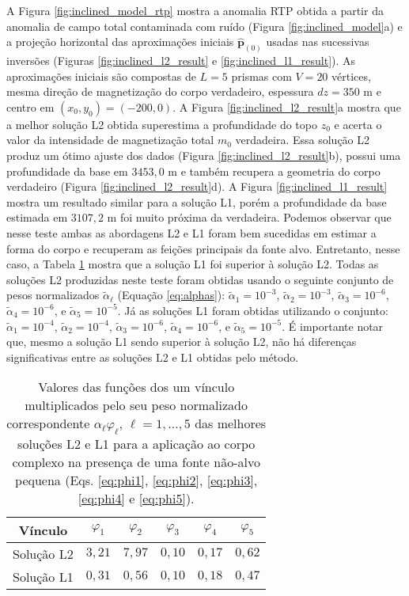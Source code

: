 A Figura \ref{fig:inclined_model_rtp} mostra a anomalia RTP obtida a partir da anomalia de campo total contaminada com ruído (Figura \ref{fig:inclined_model}a) e 
a projeção horizontal das aproximações iniciais $\hat{\mathbf{p}}_{(0)}$ 
usadas nas sucessivas inversões (Figuras \ref{fig:inclined_l2_result} e 
\ref{fig:inclined_l1_result}).
As aproximações iniciais são compostas de $ L= 5$ prismas com $ V = 20 $ vértices, mesma direção de magnetização do corpo verdadeiro, espessura $ dz=350 $ m e centro em $ (x_0, y_0) = (-200, 0) $.
A Figura \ref{fig:inclined_l2_result}a mostra que a melhor solução L2 obtida superestima a profundidade do topo $z_{0}$ e acerta o valor da intensidade de magnetização total $m_{0}$ verdadeira. Essa solução L2 produz um ótimo ajuste dos dados (Figura \ref{fig:inclined_l2_result}b), possui uma profundidade da base em $3453,0$ m e também recupera a geometria do corpo verdadeiro (Figura \ref{fig:inclined_l2_result}d).
A Figura \ref{fig:inclined_l1_result} mostra um resultado similar para a solução L1, porém a profundidade da base estimada em $3107,2$ m foi muito próxima da verdadeira.
Podemos observar que nesse teste ambas as abordagens L2 e L1 foram bem sucedidas em estimar a forma do corpo e recuperam as feições principais da fonte alvo. Entretanto, nesse caso, a Tabela \ref{tab:inc} mostra que a solução L1 foi superior à solução L2.
Todas as soluções L2 produzidas neste teste foram obtidas usando o seguinte conjunto de pesos normalizados $\tilde{\alpha}_{\ell}$ (Equação \ref{eq:alphas}): 
$\tilde{\alpha}_{1} = 10^{-3}$, $\tilde{\alpha}_{2} = 10^{-3}$, 
$\tilde{\alpha}_{3} = 10^{-6}$, $\tilde{\alpha}_{4} = 10^{-6}$, e 
$\tilde{\alpha}_{5} = 10^{-5}$. 
Já as soluções L1 foram obtidas utilizando o conjunto: 
$\tilde{\alpha}_{1} = 10^{-4}$, $\tilde{\alpha}_{2} = 10^{-4}$, 
$\tilde{\alpha}_{3} = 10^{-6}$, $\tilde{\alpha}_{4} = 10^{-6}$, e 
$\tilde{\alpha}_{5} = 10^{-5}$.
É importante notar que, mesmo a solução L1 sendo superior à solução L2, não há diferenças significativas entre as soluções L2 e L1 obtidas pelo método.

\begin{table}[h]\label{tab:inc}
	\caption{Valores das funções dos um vínculo multiplicados pelo seu peso normalizado correspondente $ \alpha_\ell \varphi_\ell  $, $ \ell=1,\dots,5 $ das melhores soluções L2 e L1 para a aplicação ao corpo complexo na presença de uma fonte não-alvo pequena (Eqs. \ref{eq:phi1}, \ref{eq:phi2}, \ref{eq:phi3}, \ref{eq:phi4} e \ref{eq:phi5}).}
	\centering
	\vspace{0.5cm}
	\begin{tabular}{c|ccccc}
		Vínculo & $ \varphi _1 $ & $ \varphi _2 $ &  $ \varphi _3 $ &  $ \varphi _4 $ &  $ \varphi _5 $ \\
		\hline
		Solução L2 & $ 3,21 $ & $ 7,97 $ & $ 0,10 $ & $0,17 $ & $ 0,62 $ \\ 
		Solução L1 & $ 0,31 $ & $ 0,56 $ & $ 0,10 $ & $0,18$ & $ 0,47 $
	\end{tabular}
\end{table}

